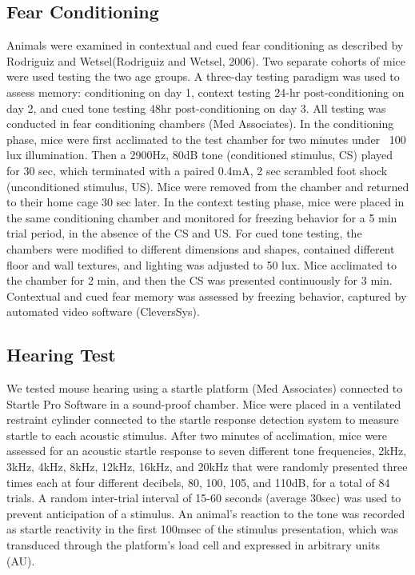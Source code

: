 \subsection{Fear Conditioning}
Animals were examined in contextual and cued fear
conditioning as described by Rodriguiz and Wetsel(Rodriguiz and Wetsel, 2006).
Two separate cohorts of mice were used testing the two age groups. A three-day
testing paradigm was used to assess memory: conditioning on day 1, context
testing 24-hr post-conditioning on day 2, and cued tone testing 48hr
post-conditioning on day 3. All testing was conducted in fear conditioning
chambers (Med Associates). In the conditioning phase, mice were first acclimated
to the test chamber for two minutes under ~100 lux illumination. Then a 2900Hz,
80dB tone (conditioned stimulus, CS) played for 30 sec, which terminated with a
paired 0.4mA, 2 sec scrambled foot shock (unconditioned stimulus, US). Mice were
removed from the chamber and returned to their home cage 30 sec later. In the
context testing phase, mice were placed in the same conditioning chamber and
monitored for freezing behavior for a 5 min trial period, in the absence of the
CS and US. For cued tone testing, the chambers were modified to different
dimensions and shapes, contained different floor and wall textures, and lighting
was adjusted to 50 lux. Mice acclimated to the chamber for 2 min, and then the
CS was presented continuously for 3 min.  Contextual and cued fear memory was
assessed by freezing behavior, captured by automated video software
(CleversSys).

\subsection{Hearing Test}
We tested mouse hearing using a startle platform
(Med Associates) connected to Startle Pro Software in a sound-proof chamber.
Mice were placed in a ventilated restraint cylinder connected to the startle
response detection system to measure startle to each acoustic stimulus. After
two minutes of acclimation, mice were assessed for an acoustic startle response
to seven different tone frequencies, 2kHz, 3kHz, 4kHz, 8kHz, 12kHz, 16kHz, and
20kHz that were randomly presented three times each at four different decibels,
80, 100, 105, and 110dB, for a total of 84 trials. A random inter-trial interval
of 15-60 seconds (average 30sec) was used to prevent anticipation of a stimulus.
An animal’s reaction to the tone was recorded as startle reactivity in the first
100msec of the stimulus presentation, which was transduced through the
platform’s load cell and expressed in arbitrary units (AU).  

